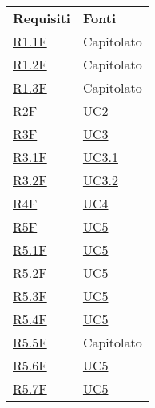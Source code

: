 
\begin{center}
    \centering
    \renewcommand{\arraystretch}{1.8}
    \label{tab:RequisitiFonti}
    \begin{longtable}[!h]{p{50px} p{50px}}
        \rowcolor{logo!70} \textbf{Requisiti}        & \textbf{Fonti}                \\

        \hyperref[tab:RequisitiFunzionali]{R1.1F}    & Capitolato                    \\
        \hyperref[tab:RequisitiFunzionali]{R1.2F}    & Capitolato                    \\
        \hyperref[tab:RequisitiFunzionali]{R1.3F}    & Capitolato                    \\
        \hyperref[tab:RequisitiFunzionali]{R2F}      & \hyperref[sec:UC2]{UC2}       \\
        \hyperref[tab:RequisitiFunzionali]{R3F}      & \hyperref[sec:UC3]{UC3}       \\
        \hyperref[tab:RequisitiFunzionali]{R3.1F}    & \hyperref[sec:UC3.1]{UC3.1}   \\
        \hyperref[tab:RequisitiFunzionali]{R3.2F}    & \hyperref[sec:UC3.2]{UC3.2}   \\
        \hyperref[tab:RequisitiFunzionali]{R4F}      & \hyperref[sec:UC4]{UC4}       \\
        \hyperref[tab:RequisitiFunzionali]{R5F}      & \hyperref[sec:UC5]{UC5}       \\
        \hyperref[tab:RequisitiFunzionali]{R5.1F}    & \hyperref[sec:UC5]{UC5}       \\
        \hyperref[tab:RequisitiFunzionali]{R5.2F}    & \hyperref[sec:UC5]{UC5}       \\
        \hyperref[tab:RequisitiFunzionali]{R5.3F}    & \hyperref[sec:UC5]{UC5}       \\
        \hyperref[tab:RequisitiFunzionali]{R5.4F}    & \hyperref[sec:UC5]{UC5}       \\
        \hyperref[tab:RequisitiFunzionali]{R5.5F}    & Capitolato                    \\
        \hyperref[tab:RequisitiFunzionali]{R5.6F}    & \hyperref[sec:UC5]{UC5}       \\
        \hyperref[tab:RequisitiFunzionali]{R5.7F}    & \hyperref[sec:UC5]{UC5}       \\

\end{longtable}
\end{center}
